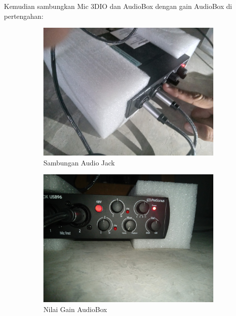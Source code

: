 \documentclass{article}
\begin{document}
	Kemudian sambungkan Mic 3DIO dan AudioBox dengan gain AudioBox di pertengahan:

	\begin{figure}[H]
		\centering
		\begin{subfigure}[]{.4\textwidth}
			\includegraphics[width=\textwidth]{images/3dio_presonus_jack}
			\caption{Sambungan Audio Jack}
		\end{subfigure}
		\begin{subfigure}[]{.4\textwidth}
			\includegraphics[width=\textwidth,angle=180]{images/3dio_presonus_set}
			\caption{Nilai Gain AudioBox}
		\end{subfigure}
		\\
		\begin{subfigure}[]{.4\textwidth}

\end{subfigure}
\end{figure}
\end{document}
